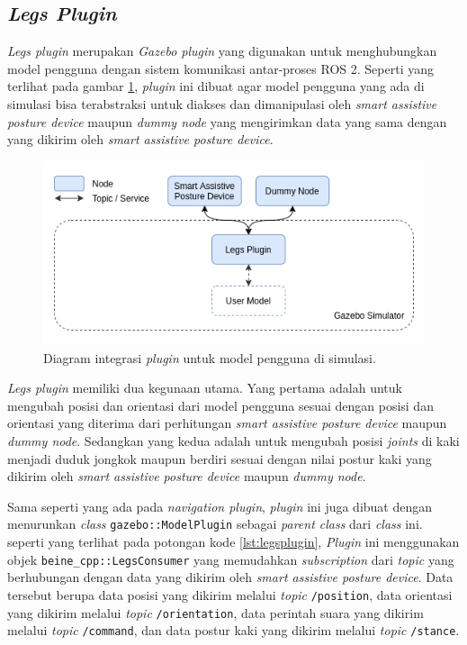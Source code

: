 \subsection{\emph{Legs Plugin}}
\label{subsec:legsplugin}

\emph{Legs plugin} merupakan \emph{Gazebo plugin} yang digunakan untuk menghubungkan model pengguna dengan sistem komunikasi antar-proses ROS 2.
Seperti yang terlihat pada gambar \ref{fig:integrasipluginpengguna},
  \emph{plugin} ini dibuat agar model pengguna yang ada di simulasi bisa terabstraksi untuk diakses dan dimanipulasi oleh \emph{smart assistive posture device} maupun \emph{dummy node} yang mengirimkan data yang sama dengan yang dikirim oleh \emph{smart assistive posture device}.

\begin{figure}[ht]
  \centering
  \includegraphics[scale=0.5]{gambar/integrasi-plugin-pengguna.png}
  \caption{Diagram integrasi \emph{plugin} untuk model pengguna di simulasi.}
  \label{fig:integrasipluginpengguna}
\end{figure}

\emph{Legs plugin} memiliki dua kegunaan utama.
Yang pertama adalah untuk mengubah posisi dan orientasi dari model pengguna sesuai dengan posisi dan orientasi yang diterima dari perhitungan \emph{smart assistive posture device} maupun \emph{dummy node}.
Sedangkan yang kedua adalah untuk mengubah posisi \emph{joints} di kaki menjadi duduk jongkok maupun berdiri sesuai dengan nilai postur kaki yang dikirim oleh \emph{smart assistive posture device} maupun \emph{dummy node}.



Sama seperti yang ada pada \emph{navigation plugin},
  \emph{plugin} ini juga dibuat dengan menurunkan \emph{class} \lstinline{gazebo::ModelPlugin} sebagai \emph{parent class} dari \emph{class} ini.
seperti yang terlihat pada potongan kode \ref{lst:legsplugin},
  \emph{Plugin} ini menggunakan objek \lstinline{beine_cpp::LegsConsumer} yang memudahkan \emph{subscription} dari \emph{topic} yang berhubungan dengan data yang dikirim oleh \emph{smart assistive posture device}.
Data tersebut berupa data posisi yang dikirim melalui \emph{topic} \lstinline{/position},
  data orientasi yang dikirim melalui \emph{topic} \lstinline{/orientation},
  data perintah suara yang dikirim melalui \emph{topic} \lstinline{/command},
  dan data postur kaki yang dikirim melalui \emph{topic} \lstinline{/stance}.

